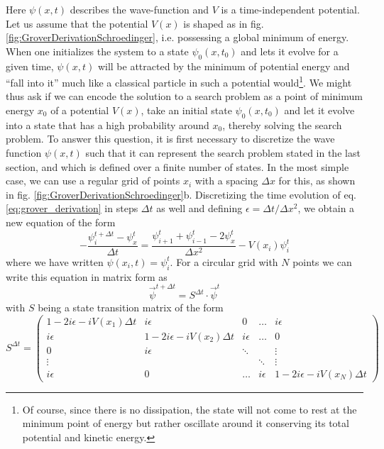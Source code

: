 Here $\psi(x,t)$ describes the wave-function and $V$ is a time-independent potential. Let us assume that the potential $V(x)$ is shaped as in fig. \ref{fig:GroverDerivationSchroedinger}, i.e. possessing a global minimum of energy. When one initializes the system to a state $\psi_0(x,t_0)$ and lets it evolve for a given time, $\psi(x,t)$ will be attracted by the minimum of potential energy and ``fall into it'' much like a classical particle in such a potential would\footnote{Of course, since there is no dissipation, the state will not come to rest at the minimum point of energy but rather oscillate around it conserving its total potential and kinetic energy.}. We might thus ask if we can encode the solution to a search problem as a point of minimum energy $x_0$ of a potential $V(x)$, take an initial state $\psi_0(x,t_0)$ and let it evolve into a state that has a high probability around $x_0$, thereby solving the search problem. To answer this question, it is first necessary to discretize the wave function $\psi(x,t)$ such that it can represent the search problem stated in the last section, and which is defined over a finite number of states. In the most simple case, we can use a regular grid of points $x_i$ with a spacing $\Delta x$ for this, as shown in fig. \ref{fig:GroverDerivationSchroedinger}b. Discretizing the time evolution of eq. \ref{eq:grover_derivation} in steps $\Delta t$ as well and defining $\epsilon = \Delta t/\Delta x^2$, we obtain a new equation of the form
%
\begin{equation}
-\frac{\psi_i^{t+\Delta t}-\psi_x^{t}}{\Delta t} = \frac{\psi_{i+1}^t+\psi_{i-1}^t-2\psi_x^t}{\Delta x^2} -V(x_i)\psi_i^t
\end{equation}
%
where we have written $\psi(x_i,t)=\psi_i^t$. For a circular grid with $N$ points we can write this equation in matrix form as
%
\begin{equation}
\vec{\psi}^{t+\Delta t} = S^{\Delta t}  \cdot \vec{\psi}^t
\end{equation}
%
with $S$ being a state transition matrix of the form
%
\begin{equation}
S^{\Delta t} = \left(
	\begin{array}{ccccc}
		1-2i\epsilon-iV(x_1)\Delta t & i\epsilon & 0 & \hdots &  i\epsilon \\
		i \epsilon & 1-2i\epsilon -iV(x_2)\Delta t & i\epsilon & \hdots & 0 \\
		0 & i\epsilon & \ddots & & \vdots \\
		\vdots & & & \ddots  & \vdots \\
		i \epsilon & 0 & \hdots & i\epsilon & 1 - 2i\epsilon -iV(x_N)\Delta t
	\end{array}
 \right) \label{eq:grover_iteration_matrix}
\end{equation}
